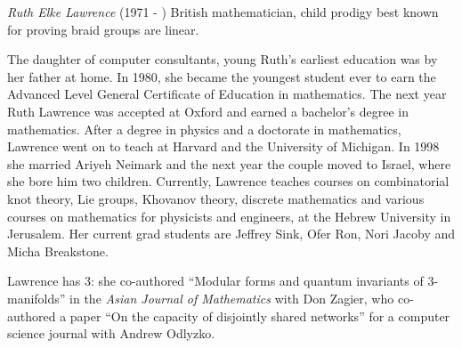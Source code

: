 \documentclass[12pt]{article}
\begin{document}

\emph{Ruth Elke Lawrence} (1971 - ) British mathematician, child prodigy best known for proving braid groups are linear.

The daughter of computer consultants, young Ruth's earliest education was by her father at home. In 1980, she became the youngest student ever to earn the Advanced Level General Certificate of Education in mathematics. The next year Ruth Lawrence was accepted at Oxford and earned a bachelor's degree in mathematics. After a degree in physics and a doctorate in mathematics, Lawrence went on to teach at Harvard and the University of Michigan. In 1998 she married Ariyeh Neimark and the next year the couple moved to Israel, where she bore him two children. Currently, Lawrence teaches courses on combinatorial knot theory, Lie groups, Khovanov theory, discrete mathematics and various courses on mathematics for physicists and engineers, at the Hebrew University in Jerusalem. Her current grad students are Jeffrey Sink, Ofer Ron, Nori Jacoby and Micha Breakstone.

Lawrence has  3: she co-authored ``Modular forms and quantum invariants of 3-manifolds'' in the {\it Asian Journal of Mathematics} with Don Zagier, who co-authored a paper ``On the capacity of disjointly shared networks'' for a computer science journal with Andrew Odlyzko.
\end{document}

